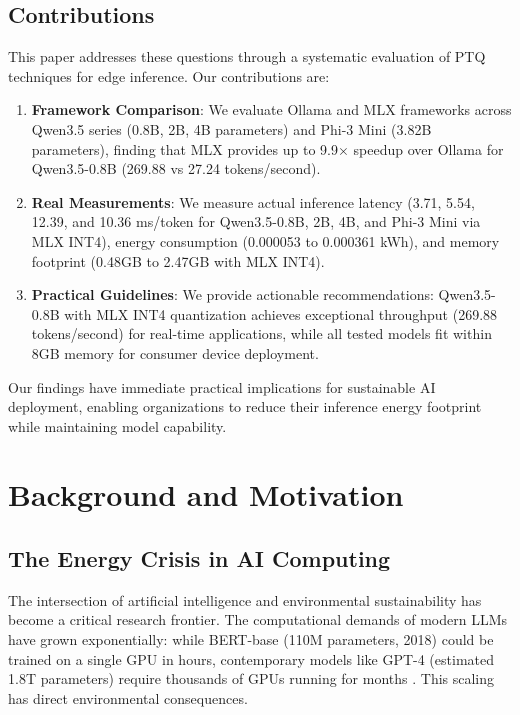 \documentclass[11pt,a4paper]{article}
\begin{document}
\subsection{Contributions}

This paper addresses these questions through a systematic evaluation of PTQ techniques for edge inference. Our contributions are:

\begin{enumerate}[leftmargin=*,nosep]
    \item \textbf{Framework Comparison}: We evaluate Ollama and MLX frameworks across Qwen3.5 series (0.8B, 2B, 4B parameters) and Phi-3 Mini (3.82B parameters), finding that MLX provides up to 9.9$\times$ speedup over Ollama for Qwen3.5-0.8B (269.88 vs 27.24 tokens/second).
    
    \item \textbf{Real Measurements}: We measure actual inference latency (3.71, 5.54, 12.39, and 10.36 ms/token for Qwen3.5-0.8B, 2B, 4B, and Phi-3 Mini via MLX INT4), energy consumption (0.000053 to 0.000361 kWh), and memory footprint (0.48GB to 2.47GB with MLX INT4).
    
    \item \textbf{Practical Guidelines}: We provide actionable recommendations: Qwen3.5-0.8B with MLX INT4 quantization achieves exceptional throughput (269.88 tokens/second) for real-time applications, while all tested models fit within 8GB memory for consumer device deployment.
\end{enumerate}

Our findings have immediate practical implications for sustainable AI deployment, enabling organizations to reduce their inference energy footprint while maintaining model capability.

\section{Background and Motivation}

\subsection{The Energy Crisis in AI Computing}

The intersection of artificial intelligence and environmental sustainability has become a critical research frontier. The computational demands of modern LLMs have grown exponentially: while BERT-base (110M parameters, 2018) could be trained on a single GPU in hours, contemporary models like GPT-4 (estimated 1.8T parameters) require thousands of GPUs running for months \cite{openai2023gpt4}. This scaling has direct environmental consequences.
\end{document}
